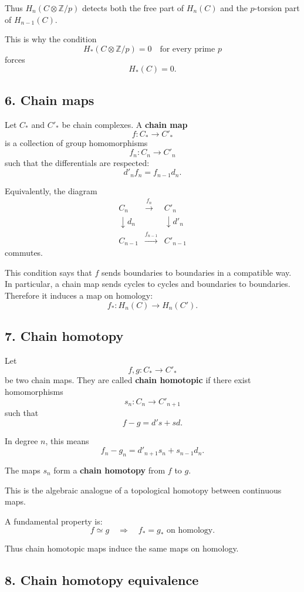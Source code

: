 \documentclass[12pt,a4paper]{article}
\theoremstyle{notespace}
\begin{document}
Thus \(H_n(C\otimes \mathbb Z/p)\) detects both the free part of \(H_n(C)\) and the \(p\)-torsion part of \(H_{n-1}(C)\).

This is why the condition
\[
H_*(C\otimes \mathbb Z/p)=0
\quad
\text{for every prime }p
\]
forces
\[
H_*(C)=0.
\]

\subsection*{6. Chain maps}

Let \(C_*\) and \(C'_*\) be chain complexes. A \textbf{chain map}
\[
f:C_*\to C'_*
\]
is a collection of group homomorphisms
\[
f_n:C_n\to C'_n
\]
such that the differentials are respected:
\[
d'_n f_n=f_{n-1}d_n.
\]

Equivalently, the diagram
\[
\begin{array}{ccc}
	C_n & \xrightarrow{f_n} & C'_n\\
	\downarrow d_n && \downarrow d'_n\\
	C_{n-1} & \xrightarrow{f_{n-1}} & C'_{n-1}
\end{array}
\]
commutes.

This condition says that \(f\) sends boundaries to boundaries in a compatible way. In particular, a chain map sends cycles to cycles and boundaries to boundaries. Therefore it induces a map on homology:
\[
f_*:H_n(C)\to H_n(C').
\]

\subsection*{7. Chain homotopy}

Let
\[
f,g:C_*\to C'_*
\]
be two chain maps. They are called \textbf{chain homotopic} if there exist homomorphisms
\[
s_n:C_n\to C'_{n+1}
\]
such that
\[
f-g=d's+sd.
\]

In degree \(n\), this means
\[
f_n-g_n
=
d'_{n+1}s_n+s_{n-1}d_n.
\]

The maps \(s_n\) form a \textbf{chain homotopy} from \(f\) to \(g\).

This is the algebraic analogue of a topological homotopy between continuous maps.

A fundamental property is:
\[
f\simeq g
\quad\Longrightarrow\quad
f_*=g_* \text{ on homology}.
\]

Thus chain homotopic maps induce the same maps on homology.

\subsection*{8. Chain homotopy equivalence}
\end{document}
